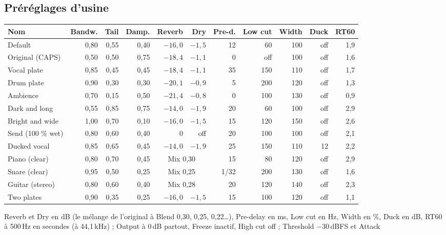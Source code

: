 \documentclass[a4paper,11pt]{article}
\newcommand{\dB}{\,dB}
\newcommand{\dBFS}{\,dBFS}
\begin{document}
\subsection{Préréglages d'usine}
\begin{center}
\small
\begin{tabular}{@{}l r r r r r r r r r r@{}}
\toprule
Nom & Bandw. & Tail & Damp. & Reverb & Dry & Pre-d. & Low cut & Width & Duck & RT60 \\
\midrule
Default           & 0,80 & 0,55 & 0,40 & $-16{,}0$ & $-1{,}5$ & 12 & 60  & 100 & off & 1,9 \\
Original (CAPS)   & 0,50 & 0,50 & 0,75 & $-18{,}4$ & $-1{,}1$ & 0  & off & 100 & off & 1,6 \\
Vocal plate       & 0,85 & 0,45 & 0,45 & $-18{,}4$ & $-1{,}1$ & 35 & 150 & 110 & off & 1,7 \\
Drum plate        & 0,90 & 0,30 & 0,30 & $-20{,}1$ & $-0{,}9$ & 5  & 200 & 120 & off & 1,3 \\
Ambience          & 0,70 & 0,15 & 0,50 & $-21{,}4$ & $-0{,}8$ & 0  & 100 & 130 & off & 0,9 \\
Dark and long     & 0,55 & 0,85 & 0,75 & $-14{,}0$ & $-1{,}9$ & 20 & 60  & 100 & off & 2,9 \\
Bright and wide   & 1,00 & 0,70 & 0,10 & $-16{,}0$ & $-1{,}5$ & 15 & 120 & 150 & off & 2,6 \\
Send (100 \% wet) & 0,80 & 0,60 & 0,40 & 0 & off & 20 & 100 & 100 & off & 2,1 \\
Ducked vocal      & 0,85 & 0,65 & 0,45 & $-14{,}0$ & $-1{,}9$ & 25 & 150 & 110 & 12  & 2,2 \\
Piano (clear)     & 0,80 & 0,70 & 0,45 & \multicolumn{2}{c}{Mix 0,30} & 15 & 80 & 120 & off & 2,9 \\
Snare (clear)     & 0,95 & 0,50 & 0,25 & \multicolumn{2}{c}{Mix 0,25} & 1/32 & 200 & 130 & off & 1,6 \\
Guitar (stereo)   & 0,80 & 0,60 & 0,40 & \multicolumn{2}{c}{Mix 0,28} & 20 & 120 & 140 & off & 2,3 \\
Two plates        & 0,90 & 0,35 & 0,25 & $-16{,}0$ & $-1{,}5$ & 15 & 100 & 120 & off & 1,1 \\
\bottomrule
\end{tabular}
\end{center}
Reverb et Dry en dB (le mélange de l'original à Blend 0,30, 0,25, 0,22\ldots), Pre-delay en ms, Low cut en Hz, Width en
\%, Duck en dB, RT60 à 500\,Hz en secondes (à
44,1\,kHz) ; Output à 0\dB{} partout, Freeze inactif, High cut off ; Threshold $-30$\dBFS{} et Attack
\end{document}
